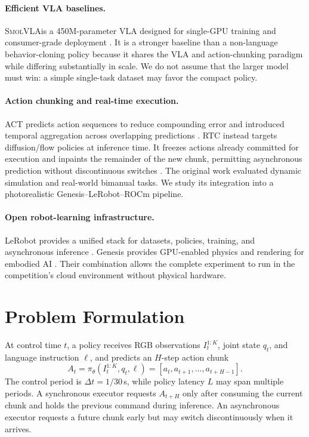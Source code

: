 \documentclass[10pt,twocolumn]{article}
\newcommand{\smolvla}{\textsc{SmolVLA}}
\begin{document}
\paragraph{Efficient VLA baselines.}
\smolvla is a 450M-parameter VLA designed for single-GPU training and
consumer-grade deployment \cite{shukor2025smolvla}.  It is a stronger baseline
than a non-language behavior-cloning policy because it shares the VLA and
action-chunking paradigm while differing substantially in scale.  We do not
assume that the larger model must win: a simple single-task dataset may favor
the compact policy.

\paragraph{Action chunking and real-time execution.}
ACT predicts action sequences to reduce compounding error and introduced
temporal aggregation across overlapping predictions \cite{zhao2023act}.
RTC instead targets diffusion/flow policies at inference time.  It freezes
actions already committed for execution and inpaints the remainder of the new
chunk, permitting asynchronous prediction without discontinuous switches
\cite{black2025rtc}.  The original work evaluated dynamic simulation and
real-world bimanual tasks.  We study its integration into a photorealistic
Genesis--LeRobot--ROCm pipeline.

\paragraph{Open robot-learning infrastructure.}
LeRobot provides a unified stack for datasets, policies, training, and
asynchronous inference \cite{cadene2026lerobot}.  Genesis provides GPU-enabled
physics and rendering for embodied AI \cite{genesis2024}.  Their combination
allows the complete experiment to run in the competition's cloud environment
without physical hardware.

\section{Problem Formulation}

At control time $t$, a policy receives RGB observations
$I_t^{1:K}$, joint state $q_t$, and language instruction $\ell$, and predicts
an $H$-step action chunk
\begin{equation}
  A_t = \pi_\theta(I_t^{1:K}, q_t, \ell)
      = [a_t, a_{t+1}, \ldots, a_{t+H-1}].
\end{equation}
The control period is $\Delta t=1/30$\,s, while policy latency
$L$ may span multiple periods.  A synchronous executor requests $A_{t+H}$
only after consuming the current chunk and holds the previous command during
inference.  An asynchronous executor requests a future chunk early but may
switch discontinuously when it arrives.
\end{document}
